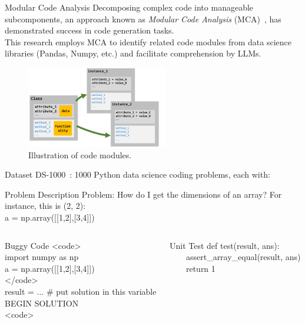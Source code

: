 \begin{frame}{Modular Code Analysis}
    Decomposing complex code into manageable subcomponents, an approach known as \textit{Modular Code Analysis} (MCA)~\cite{le2023codechain}, has demonstrated success in code generation tasks.\\
    This research employs MCA to identify related code modules from data science libraries (Pandas, Numpy, etc.) and facilitate comprehension by LLMs.
    \begin{figure}[!htb]
        \centering
        \includegraphics[width=0.55\textwidth]{img/class_diagram}
        \captionsetup{font=small,labelformat=empty}
        \caption{Illustration of code modules.}
    \end{figure}
\end{frame}

\begin{frame}{Dataset}
    DS-1000~\cite{pmlr-v202-lai23b}: 1000 Python data science coding problems, each with:
    \begin{block}{Problem Description}
        \small
        Problem:
        How do I get the dimensions of an array? For instance, this is (2, 2):\\
        a = np.array([[1,2],[3,4]])
    \end{block}

    \begin{columns}[T]
        \begin{column}{0.50\textwidth}
            \begin{block}{Buggy Code}
                \small
                <code>\\
                import numpy as np\\
                a = np.array([[1,2],[3,4]])\\
                </code>\\
                result = $\ldots$ \# put solution in this variable\\
                BEGIN SOLUTION\\
                <code>
            \end{block}
        \end{column}
        \begin{column}{0.45\textwidth}
            \begin{block}{Unit Test}
                \small
                def test(result, ans):\\
                \ \ \ \ assert\_array\_equal(result, ans)\\
                \ \ \ \ return 1
            \end{block}
        \end{column}
    \end{columns}
\end{frame}

